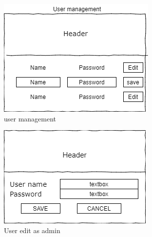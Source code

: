 \documentclass{article}
\begin{document}
\begin{figure}[!h]
    \centering
    \includegraphics{user_management}
    \caption{user management}
    \label{fig:user management}
\end{figure}

\begin{figure}[!h]
    \centering
    \includegraphics{usr_management_edit}
    \caption{User edit as admin}
    \label{fig:usr_management_edit}
\end{figure}
\end{document}
